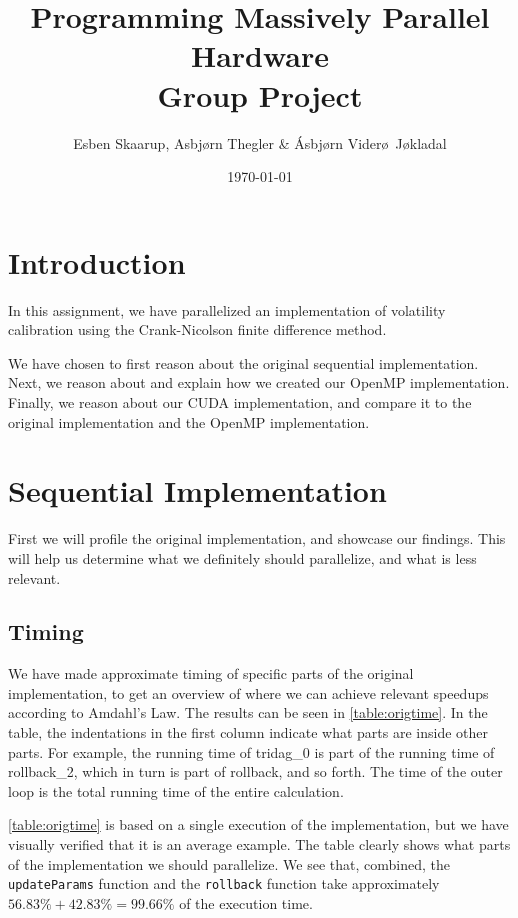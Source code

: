 \documentclass[11pt]{article}
\def\Title{Programming Massively Parallel Hardware\\
\vspace{1.5cm}
\textbf{Group Project}}
\def\Author{Esben Skaarup, Asbj\o rn Thegler \& \'{A}sbj\o rn Vider\o \ J\o kladal}
\begin{document}
\title{\Title}
\author{\Author}
\date{\today}
\maketitle

\section{Introduction}
In this assignment, we have parallelized an implementation of volatility calibration using the Crank-Nicolson finite difference method.

We have chosen to first reason about the original sequential implementation. 
Next, we reason about and explain how we created our OpenMP 
implementation. Finally, we reason about our CUDA implementation, and compare
it to the original implementation and the OpenMP implementation.

\section{Sequential Implementation}
First we will profile the original implementation, and showcase our findings.
This will help us determine what we definitely should parallelize, and what is
less relevant.

\subsection{Timing}
We have made approximate timing of specific parts of the original 
implementation, to get an overview 
of where we can achieve relevant speedups according to Amdahl's Law. The results
can be seen in \autoref{table:origtime}. In the table, the indentations 
in the first column indicate what parts are inside other parts. For example,
the running time of tridag\_0 is part of the running time of rollback\_2, which
in turn is part of rollback, and so forth. The time of the outer loop is the 
total running time of the entire calculation. 

\autoref{table:origtime} is based on a single execution of the implementation, 
but we have visually verified that it is an average example. 
The table clearly shows what parts of the implementation we should parallelize.
We see that, combined, the \texttt{updateParams} function and the \texttt{rollback} function take approximately $56.83\%+42.83\%=99.66\%$ of the execution time.
\end{document}
